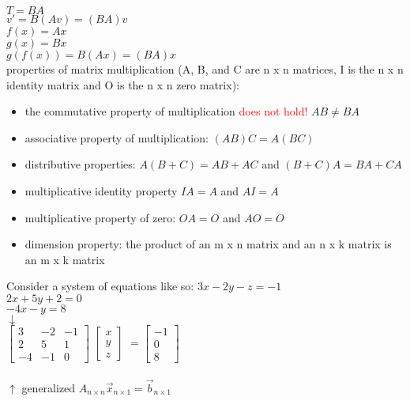 \documentclass{article}
\begin{document}
$T = BA$\\
$v' = B(Av) = (BA)v$\\
$f(x) = Ax$\\
$g(x) = Bx$\\
$g(f(x)) = B(Ax) = (BA)x$\\

properties of matrix multiplication (A, B, and C are n x n matrices, I is the n x n identity matrix and O is the n x n zero matrix):
	\begin{itemize}
		\item the commutative property of multiplication \textcolor{red}{does not hold!} $AB \neq BA$
		\item associative property of multiplication: $(AB)C = A(BC)$
		\item distributive properties: $A(B + C) = AB + AC$ and $(B + C)A = BA + CA$
		\item multiplicative identity property $IA = A$ and $AI = A$
		\item multiplicative property of zero: $OA = O$ and $AO = O$
		\item dimension property: the product of an m x n matrix and an n x k matrix is an m x k matrix
	\end{itemize}

Consider a system of equations like so:
$3x - 2y - z = -1$\\
$2x + 5y + 2 = 0$\\
$-4x - y = 8$\\
$\downarrow$\\

$
\begin{bmatrix}
3 & -2 & -1\\
2 & 5 & 1\\
-4 & -1 & 0
\end{bmatrix}
$
$
\begin{bmatrix}
x\\
y\\
z
\end{bmatrix}
$
$
=
\begin{bmatrix}
-1\\
0\\
8
\end{bmatrix}
$\\\\

$\uparrow$ generalized $A_{n \times n}\vec{x}_{n \times 1} = \vec{b}_{n \times 1}$\\
\end{document}
